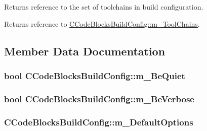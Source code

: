 Returns reference to the set of toolchains in build configuration. 

\begin{DoxyReturn}{Returns}
reference to \hyperlink{classCCodeBlocksBuildConfig_a6228c5d7803e50f70065f6fe9e24c4be}{C\-Code\-Blocks\-Build\-Config\-::m\-\_\-\-Tool\-Chains}. 
\end{DoxyReturn}


\subsection{Member Data Documentation}
\hypertarget{classCCodeBlocksBuildConfig_a89e06222a6f380d708357f1cedcfac43}{
\subsubsection[{m\-\_\-\-Be\-Quiet}]{\setlength{\rightskip}{0pt plus 5cm}bool C\-Code\-Blocks\-Build\-Config\-::m\-\_\-\-Be\-Quiet\hspace{0.3cm}{\ttfamily [private]}}}\label{classCCodeBlocksBuildConfig_a89e06222a6f380d708357f1cedcfac43}
\hypertarget{classCCodeBlocksBuildConfig_ae5a32f86104366595bb045f809cc5d5a}{
\subsubsection[{m\-\_\-\-Be\-Verbose}]{\setlength{\rightskip}{0pt plus 5cm}bool C\-Code\-Blocks\-Build\-Config\-::m\-\_\-\-Be\-Verbose\hspace{0.3cm}{\ttfamily [private]}}}\label{classCCodeBlocksBuildConfig_ae5a32f86104366595bb045f809cc5d5a}
\hypertarget{classCCodeBlocksBuildConfig_a4f4a79145c1b7bd90881901f9ae98bb5}{
\subsubsection[{m\-\_\-\-Default\-Options}]{ C\-Code\-Blocks\-Build\-Config\-::m\-\_\-\-Default\-Options\hspace{0.3cm}{\ttfamily [private]}}}\label{classCCodeBlocksBuildConfig_a4f4a79145c1b7bd90881901f9ae98bb5}
